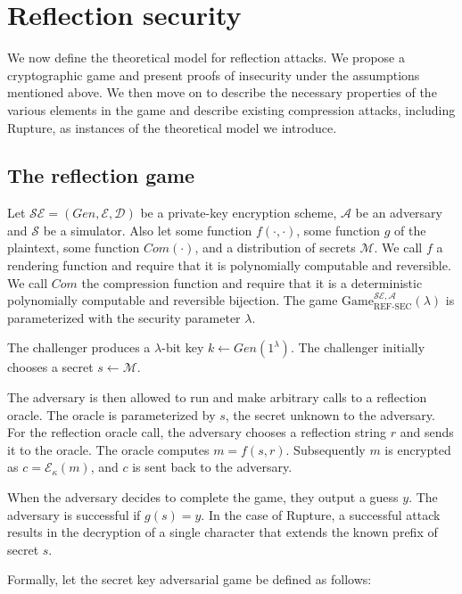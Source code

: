 \section{Reflection security}\label{sec:refsec}

We now define the theoretical model for reflection attacks. We propose a
cryptographic game and present proofs of insecurity under the assumptions
mentioned above. We then move on to describe the necessary properties of the
various elements in the game and describe existing compression attacks,
including Rupture, as instances of the theoretical model we introduce.

\subsection{The reflection game}\label{subsec:refsecgame}

Let $\mathcal{SE} = (Gen, \mathcal{E}, \mathcal{D})$ be a private-key encryption
scheme, $\mathcal{A}$ be an adversary and $\mathcal{S}$ be a simulator. Also let
some function $f(\cdot, \cdot)$, some function
$g$ of the plaintext, some function $Com(\cdot)$, and a distribution of secrets
$\mathcal{M}$. We call $f$ a rendering function and require that it
is polynomially computable and reversible. We call $Com$ the compression
function and require that it is a deterministic polynomially computable and
reversible bijection. The game
$\text{Game}_{\text{REF-SEC}}^{\mathcal{SE},\mathcal{A}}(\lambda)$ is
parameterized with the security parameter $\lambda$.

The challenger produces a $\lambda$-bit key $k \leftarrow Gen(1^\lambda)$. The
challenger initially chooses a secret $s \leftarrow \mathcal{M}$.

The adversary is then allowed to run and make arbitrary calls to a reflection
oracle. The oracle is parameterized by $s$, the secret unknown to the adversary.
For the reflection oracle call, the adversary chooses a reflection string $r$
and sends it to the oracle. The oracle computes $m = f(s, r)$. Subsequently $m$
is encrypted as $c = \mathcal{E}_\kappa(m)$, and $c$ is sent back to the
adversary.

When the adversary decides to complete the game, they output a guess $y$. The
adversary is successful if $g(s) = y$. In the case of Rupture, a successful
attack results in the decryption of a single character that extends the known
prefix of secret $s$.

Formally, let the secret key adversarial game be defined as follows:

